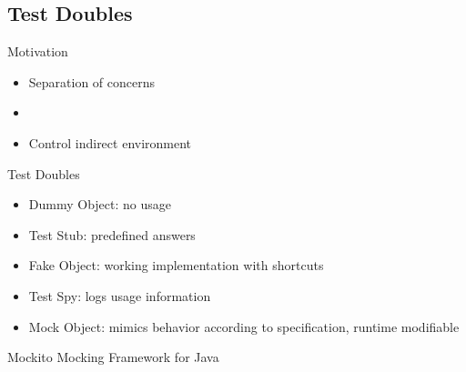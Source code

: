 \subsection{Test Doubles}
\begin{frame}[fragile]{\insertsubsection}
	\begin{fancycolumns}[animation=none]
		\begin{note}{Motivation}
			\begin{itemize}
				\item Separation of concerns
				\item {}
				\item Control indirect environment
			\end{itemize}
		\end{note}\pause
		\begin{definition}{Test Doubles}
			\begin{itemize}
				\item Dummy Object: no usage
				\item Test Stub: predefined answers
				\item Fake Object: working implementation with shortcuts
				\item Test Spy: logs usage information
				\item Mock Object: mimics behavior according to specification, runtime modifiable
			\end{itemize}
		\end{definition}\pause
		\nextcolumn
		\begin{note}{Mockito}%
			Mocking Framework for Java
		\end{note}
	\end{fancycolumns}
\end{frame}

